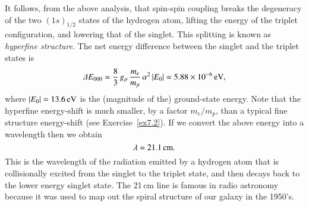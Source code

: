 It follows, from the above analysis, that spin-spin coupling breaks
the degeneracy of the two $(1s)_{1/2}$ states of the hydrogen atom, lifting the
energy of the triplet configuration, and lowering that of the singlet.
This splitting is known as {\em hyperfine structure}.
The net energy difference between the singlet and the triplet states
is
\begin{equation}
{\mit\Delta} E_{000} = \frac{8}{3}\,g_p\,\frac{m_e}{m_p}\,\alpha^2\,|E_0| = 5.88\times 10^{-6}\,{\rm eV},
\end{equation}
where $|E_0|=13.6\,{\rm eV}$ is the (magnitude of the) ground-state energy.
Note that the hyperfine energy-shift is much smaller, by a factor $m_e/m_p$, than
a typical fine structure energy-shift (see Exercise~\ref{ex7.2}).
If we convert the above energy into a wavelength then we obtain
\begin{equation}
\lambda = 21.1\,{\rm cm}.
\end{equation}
This is the wavelength of the radiation emitted by a hydrogen atom
that is collisionally excited from the singlet to the triplet
state, and then decays back to the lower energy singlet state. 
The 21\,cm line is famous in  radio astronomy because it was used to
map out the spiral structure of our galaxy in the 1950's. 

